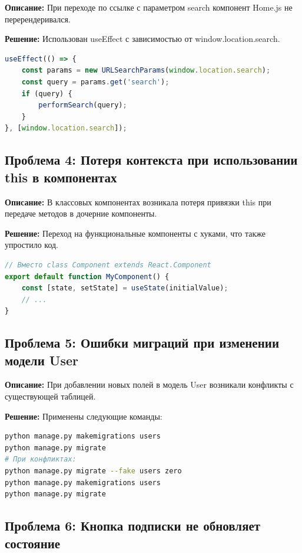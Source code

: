 \documentclass[12pt]{article}
\begin{document}
\textbf{Описание:} При переходе по ссылке с параметром search компонент Home.js не перерендеривался.

\textbf{Решение:} Использован useEffect с зависимостью от window.location.search.

\begin{lstlisting}[language=JavaScript, caption=Отслеживание изменения URL]
useEffect(() => {
    const params = new URLSearchParams(window.location.search);
    const query = params.get('search');
    if (query) {
        performSearch(query);
    }
}, [window.location.search]);
\end{lstlisting}

\subsection{Проблема 4: Потеря контекста при использовании this в компонентах}

\textbf{Описание:} В классовых компонентах возникала потеря привязки this при передаче методов в дочерние компоненты.

\textbf{Решение:} Переход на функциональные компоненты с хуками, что также упростило код.

\begin{lstlisting}[language=JavaScript, caption=Использование хуков вместо классовых компонентов]
// Вместо class Component extends React.Component
export default function MyComponent() {
    const [state, setState] = useState(initialValue);
    // ...
}
\end{lstlisting}

\subsection{Проблема 5: Ошибки миграций при изменении модели User}

\textbf{Описание:} При добавлении новых полей в модель User возникали конфликты с существующей таблицей.

\textbf{Решение:} Применены следующие команды:

\begin{lstlisting}[language=bash, caption=Применение миграций]
python manage.py makemigrations users
python manage.py migrate
# При конфликтах:
python manage.py migrate --fake users zero
python manage.py makemigrations users
python manage.py migrate
\end{lstlisting}

\subsection{Проблема 6: Кнопка подписки не обновляет состояние}
\end{document}
